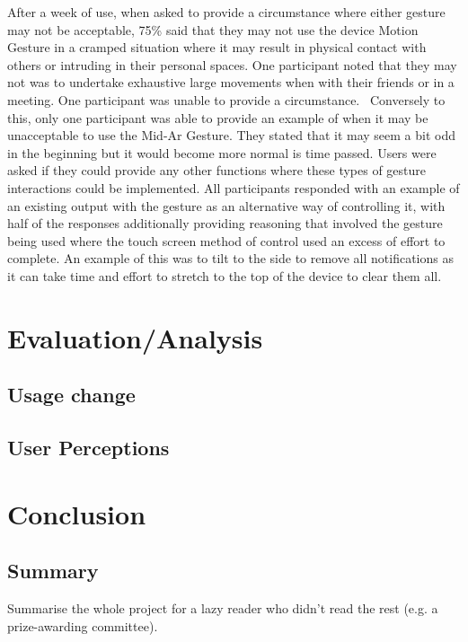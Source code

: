 \documentclass{l4proj}
\begin{document}
After a week of use, when asked to provide a circumstance where either gesture may not be acceptable, 75\% said that they may not use the device Motion Gesture in a cramped situation where it may result in physical contact with others or intruding in their personal spaces. One participant noted that they may not was to undertake exhaustive large movements when with their friends or in a meeting. One participant was unable to provide a circumstance.  Conversely to this, only one participant was able to provide an example of when it may be unacceptable to use the Mid-Ar Gesture. They stated that it may seem a bit odd in the beginning but it would become more normal is time passed. Users were asked if they could provide any other functions where these types of gesture interactions could be implemented. All participants responded with an example of an existing output with the gesture as an alternative way of controlling it, with half of the responses additionally providing reasoning that involved the gesture being used where the touch screen method of control used an excess of effort to complete. An example of this was to tilt to the side to remove all notifications as it can take time and effort to stretch to the top of the device to clear them all.


\chapter{Evaluation/Analysis} 


\section{Usage change}

\section{User Perceptions}

\chapter{Conclusion}  
\section{Summary}
Summarise the whole project for a lazy reader who didn't read the rest (e.g. a prize-awarding committee).
\end{document}
